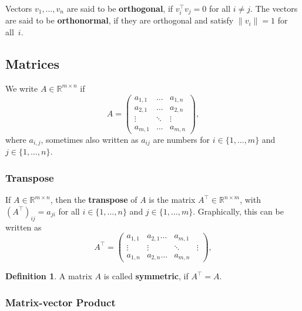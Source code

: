 \documentclass[
  a4paper,
]{article}
\theoremstyle{definition}
\newtheorem{definition}{Definition}[section]
\theoremstyle{definition}
\theoremstyle{definition}
\theoremstyle{definition}
\theoremstyle{remark}
\begin{document}
Vectors \(v_1, \ldots, v_n\) are said to be \textbf{orthogonal},
if \(v_i^\top v_j = 0\) for all \(i \neq j\). The vectors are said to be
\textbf{orthonormal}, if they are orthogonal and satisfy \(\|v_i\| = 1\)
for all~\(i\).

\hypertarget{matrix-rules}{%
\subsection{Matrices}\label{matrix-rules}}

We write \(A \in \mathbb{R}^{m\times n}\) if
\begin{equation*}
  A
  = \begin{pmatrix}
    a_{1,1} & \ldots  & a_{1,n}\\
    a_{2,1} & \ldots  & a_{2,n}\\
    \vdots & \ddots  & \vdots\\
    a_{m,1} & \ldots  & a_{m,n}
  \end{pmatrix},
\end{equation*}
where \(a_{i,j}\), sometimes also written as \(a_{ij}\) are numbers
for \(i \in \{1, \ldots, m\}\) and \(j \in \{1, \ldots, n\}\).

\hypertarget{transpose}{%
\subsubsection{Transpose}\label{transpose}}

If \(A \in \mathbb{R}^{m\times n}\), then the \textbf{transpose} of \(A\) is the matrix
\(A^\top \in \mathbb{R}^{n\times m}\), with \((A^\top)_{ij} = a_{ji}\) for all \(i \in \{1, \ldots, n\}\) and \(j \in \{1, \ldots, m\}\). Graphically,
this can be written as
\begin{equation*}
  A^\top
  = \begin{pmatrix}
    a_{1,1} & a_{2,1} \ldots  & a_{m,1}\\
    \vdots & \vdots & \ddots  & \vdots\\
    a_{1,n} & a_{2,n} \ldots  & a_{m,n}
  \end{pmatrix},
\end{equation*}

\begin{definition}
A matrix \(A\) is called \textbf{symmetric}, if \(A^\top = A\).
\end{definition}

\hypertarget{matrix-vector-product}{%
\subsubsection{Matrix-vector Product}\label{matrix-vector-product}}
\end{document}
